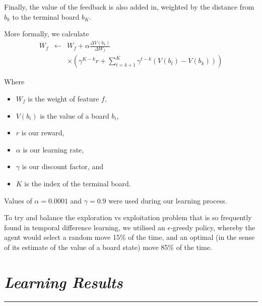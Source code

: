 \documentclass[10pt]{report}
\begin{document}
\begin{multicols}{2}
Finally, the value of the feedback is also added in, weighted by the distance from $b_k$ to the terminal board $b_K$.

More formally, we calculate 
\begin{eqnarray}
	W_f  & \leftarrow & W_f + \alpha \frac{\Delta V(b_k)}{\Delta W_f} \nonumber  \\
	&&  \times \left(\gamma^{K-k}r + \sum_{t=k+1}^K \gamma^{t-k}\left(V(b_t) - V(b_k)\right)\right) \nonumber
\end{eqnarray}

Where
   \begin{itemize}
  \item
  	$W_f$ is the weight of feature $f$,
  \item
	$V(b_i)$ is the value of a board $b_i$,
  \item
	$r$ is our reward,
 \item
	$\alpha$ is our learning rate,
  \item
	$\gamma$ is our discount factor, and
  \item
	$K$ is the index of the terminal board.
  \end{itemize}

Values of $\alpha = 0.0001$ and $\gamma = 0.9$ were used during our learning process.

To try and balance the exploration vs exploitation problem that is so frequently found in temporal difference learning, we utilised an $\epsilon$-greedy policy, whereby the agent would select a random move 15\% of the time, and an optimal (in the sense of its estimate of the value of a board state) move 85\% of the time.
\section*{\emph{\textmd{Learning Results}}}
\hrule


\end{multicols}
\end{document}
